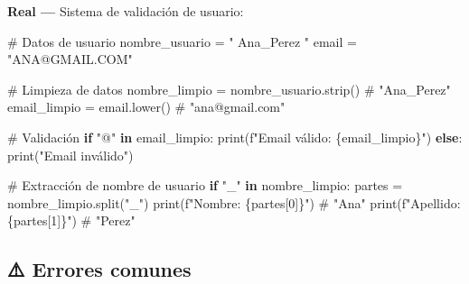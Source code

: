 \documentclass[
  doc,
  floatsintext,
  longtable,
  a4paper,
  nolmodern,
  notxfonts,
  notimes,
  12pt,
  colorlinks=true,linkcolor=blue,citecolor=blue,urlcolor=blue]{apa7}
\newenvironment{Shaded}{\begin{snugshade}}{\end{snugshade}}
\newcommand{\BuiltInTok}[1]{\textcolor[rgb]{0.00,0.23,0.31}{#1}}
\newcommand{\CommentTok}[1]{\textcolor[rgb]{0.37,0.37,0.37}{#1}}
\newcommand{\ControlFlowTok}[1]{\textcolor[rgb]{0.00,0.23,0.31}{\textbf{#1}}}
\newcommand{\DecValTok}[1]{\textcolor[rgb]{0.68,0.00,0.00}{#1}}
\newcommand{\KeywordTok}[1]{\textcolor[rgb]{0.00,0.23,0.31}{\textbf{#1}}}
\newcommand{\NormalTok}[1]{\textcolor[rgb]{0.00,0.23,0.31}{#1}}
\newcommand{\OperatorTok}[1]{\textcolor[rgb]{0.37,0.37,0.37}{#1}}
\newcommand{\SpecialCharTok}[1]{\textcolor[rgb]{0.37,0.37,0.37}{#1}}
\newcommand{\SpecialStringTok}[1]{\textcolor[rgb]{0.13,0.47,0.30}{#1}}
\newcommand{\StringTok}[1]{\textcolor[rgb]{0.13,0.47,0.30}{#1}}
\begin{document}
\textbf{Real ---} Sistema de validación de usuario:

\begin{Shaded}
\begin{Highlighting}[]
\CommentTok{\# Datos de usuario}
\NormalTok{nombre\_usuario }\OperatorTok{=} \StringTok{"  Ana\_Perez  "}
\NormalTok{email }\OperatorTok{=} \StringTok{"ANA@GMAIL.COM"}

\CommentTok{\# Limpieza de datos}
\NormalTok{nombre\_limpio }\OperatorTok{=}\NormalTok{ nombre\_usuario.strip()  }\CommentTok{\# "Ana\_Perez"}
\NormalTok{email\_limpio }\OperatorTok{=}\NormalTok{ email.lower()            }\CommentTok{\# "ana@gmail.com"}

\CommentTok{\# Validación}
\ControlFlowTok{if} \StringTok{"@"} \KeywordTok{in}\NormalTok{ email\_limpio:}
    \BuiltInTok{print}\NormalTok{(}\SpecialStringTok{f"Email válido: }\SpecialCharTok{\{}\NormalTok{email\_limpio}\SpecialCharTok{\}}\SpecialStringTok{"}\NormalTok{)}
\ControlFlowTok{else}\NormalTok{:}
    \BuiltInTok{print}\NormalTok{(}\StringTok{"Email inválido"}\NormalTok{)}

\CommentTok{\# Extracción de nombre de usuario}
\ControlFlowTok{if} \StringTok{"\_"} \KeywordTok{in}\NormalTok{ nombre\_limpio:}
\NormalTok{    partes }\OperatorTok{=}\NormalTok{ nombre\_limpio.split(}\StringTok{"\_"}\NormalTok{)}
    \BuiltInTok{print}\NormalTok{(}\SpecialStringTok{f"Nombre: }\SpecialCharTok{\{}\NormalTok{partes[}\DecValTok{0}\NormalTok{]}\SpecialCharTok{\}}\SpecialStringTok{"}\NormalTok{)  }\CommentTok{\# "Ana"}
    \BuiltInTok{print}\NormalTok{(}\SpecialStringTok{f"Apellido: }\SpecialCharTok{\{}\NormalTok{partes[}\DecValTok{1}\NormalTok{]}\SpecialCharTok{\}}\SpecialStringTok{"}\NormalTok{)  }\CommentTok{\# "Perez"}
\end{Highlighting}
\end{Shaded}

\subsection{⚠️ Errores comunes}\label{errores-comunes}
\end{document}
